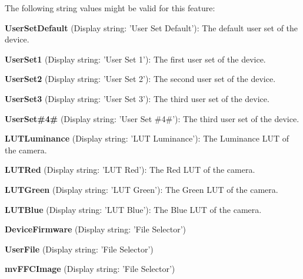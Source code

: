 The following string values might be valid for this feature\+:
\begin{DoxyItemize}
\item {\bfseries User\+Set\+Default} (Display string\+: 'User Set Default')\+: The default user set of the device.
\item {\bfseries User\+Set1} (Display string\+: 'User Set 1')\+: The first user set of the device.
\item {\bfseries User\+Set2} (Display string\+: 'User Set 2')\+: The second user set of the device.
\item {\bfseries User\+Set3} (Display string\+: 'User Set 3')\+: The third user set of the device.
\item {\bfseries User\+Set\#4\#} (Display string\+: 'User Set \#4\#')\+: The third user set of the device.
\item {\bfseries L\+U\+T\+Luminance} (Display string\+: 'L\+U\+T Luminance')\+: The Luminance L\+U\+T of the camera.
\item {\bfseries L\+U\+T\+Red} (Display string\+: 'L\+U\+T Red')\+: The Red L\+U\+T of the camera.
\item {\bfseries L\+U\+T\+Green} (Display string\+: 'L\+U\+T Green')\+: The Green L\+U\+T of the camera.
\item {\bfseries L\+U\+T\+Blue} (Display string\+: 'L\+U\+T Blue')\+: The Blue L\+U\+T of the camera.
\item {\bfseries Device\+Firmware} (Display string\+: 'File Selector')
\item {\bfseries User\+File} (Display string\+: 'File Selector')
\item {\bfseries mv\+F\+F\+C\+Image} (Display string\+: 'File Selector')
\end{DoxyItemize}


